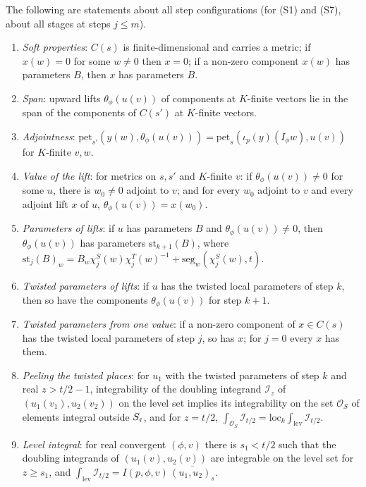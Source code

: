 \begin{definition}\label{pf:bundles:def:steps}
The following are statements about all step configurations (for (S1) and (S7), about all stages at steps $j\le m$).
\begin{enumerate}[label=(S\arabic*)]
\item \emph{Soft properties}: $C(s)$ is finite-dimensional and carries a metric; if $x(w)=0$ for some $w\ne0$ then $x=0$; if a non-zero
component $x(w)$ has parameters $B$, then $x$ has parameters $B$.
\item \emph{Span}: upward lifts $\theta_\phi(u(v))$ of components at $K$-finite vectors lie in the span of the components of $C(s')$ at
$K$-finite vectors.
\item \emph{Adjointness}: $\mathrm{pet}_{s'}(y(w),\theta_\phi(u(v)))=\mathrm{pet}_s(\iota_p(y)(I_\phi w),u(v))$ for $K$-finite $v,w$.
\item \emph{Value of the lift}: for metrics on $s,s'$ and $K$-finite $v$: if $\theta_\phi(u(v))\ne0$ for some $u$, there is $w_0\ne0$ adjoint to
$v$; and for every $w_0$ adjoint to $v$ and every adjoint lift $x$ of $u$, $\theta_\phi(u(v))=x(w_0)$.
\item \emph{Parameters of lifts}: if $u$ has parameters $B$ and $\theta_\phi(u(v))\ne0$, then $\theta_\phi(u(v))$ has parameters
$\mathrm{st}_{k+1}(B)$, where $\mathrm{st}_{j}(B)_w=B_w\chi^S_{j}(w)\chi^T_{j}(w)^{-1}+\mathrm{seg}_w(\chi^S_{j}(w),t)$.
\item \emph{Twisted parameters of lifts}: if $u$ has the twisted local parameters of step $k$, then so have the components
$\theta_\phi(u(v))$ for step $k+1$.
\item \emph{Twisted parameters from one value}: if a non-zero component of $x\in C(s)$ has the twisted local parameters of step $j$, so has
$x$; for $j=0$ every $x$ has them.
\item \emph{Peeling the twisted places}: for $u_1$ with the twisted parameters of step $k$ and real $z>t/2-1$, integrability of the doubling
integrand $\mathcal I_z$ of $(u_1(v_1),u_2(v_2))$ on the level set implies its integrability on the set $\mathcal O_S$ of elements integral outside
$S_\mathfrak c$, and for $z=t/2$, $\int_{\mathcal O_S}\mathcal I_{t/2}=\mathrm{loc}_k\int_{\mathrm{lev}}\mathcal I_{t/2}$.
\item \emph{Level integral}: for real convergent $(\phi,v)$ there is $s_1<t/2$ such that the doubling integrands of $(u_1(v),u_2(v))$ are
integrable on the level set for $z\ge s_1$, and $\int_{\mathrm{lev}}\mathcal I_{t/2}=I(p,\phi,v)\,\overline{(u_1,u_2)_s}$.

\end{enumerate}
\end{definition}
